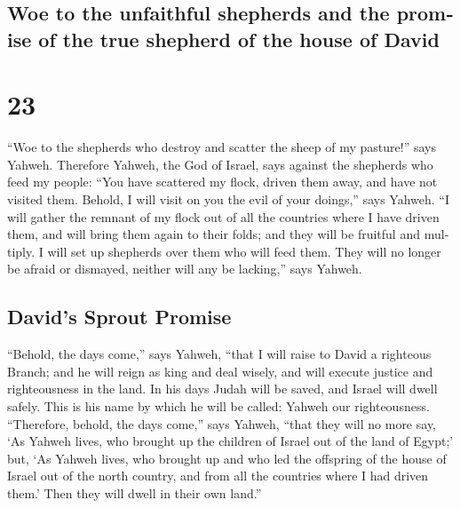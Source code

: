 \begin{paracol}{2}
\switchcolumn
\begin{otherlanguage}{english}

\hypertarget{woe-to-the-unfaithful-shepherds-and-the-promise-of-the-true-shepherd-of-the-house-of-david}{%
\subsection{Woe to the unfaithful shepherds and the promise of the true
shepherd of the house of
David}\label{woe-to-the-unfaithful-shepherds-and-the-promise-of-the-true-shepherd-of-the-house-of-david}}

\hypertarget{section-45}{%
\section{23}\label{section-45}}

 ``Woe to the shepherds who destroy and scatter the sheep
of my pasture!'' says Yahweh.  Therefore Yahweh, the God
of Israel, says against the shepherds who feed my people: ``You have
scattered my flock, driven them away, and have not visited them. Behold,
I will visit on you the evil of your doings,'' says Yahweh.
 ``I will gather the remnant of my flock out of all the
countries where I have driven them, and will bring them again to their
folds; and they will be fruitful and multiply.  I will set
up shepherds over them who will feed them. They will no longer be afraid
or dismayed, neither will any be lacking,'' says Yahweh.

\hypertarget{davids-sprout-promise}{%
\subsection{David's Sprout Promise}\label{davids-sprout-promise}}

 ``Behold, the days come,'' says Yahweh, ``that I will
raise to David a righteous Branch; and he will reign as king and deal
wisely, and will execute justice and righteousness in the land.
 In his days Judah will be saved, and Israel will dwell
safely. This is his name by which he will be called: Yahweh our
righteousness.  ``Therefore, behold, the days come,'' says
Yahweh, ``that they will no more say, `As Yahweh lives, who brought up
the children of Israel out of the land of Egypt;'  but,
`As Yahweh lives, who brought up and who led the offspring of the house
of Israel out of the north country, and from all the countries where I
had driven them.' Then they will dwell in their own land.''


\end{otherlanguage}
\end{paracol}
